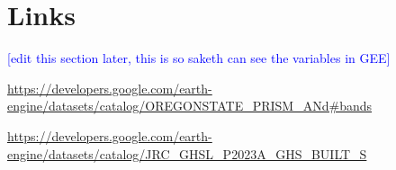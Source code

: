 \documentclass[10pt,twocolumn]{article}
\begin{document}
\section{Links}
\textcolor{blue}{[edit this section later, this is so saketh can see the variables in GEE]}

\url{https://developers.google.com/earth-engine/datasets/catalog/OREGONSTATE_PRISM_ANd#bands}

\url{https://developers.google.com/earth-engine/datasets/catalog/JRC_GHSL_P2023A_GHS_BUILT_S}

\url{}
\end{document}
